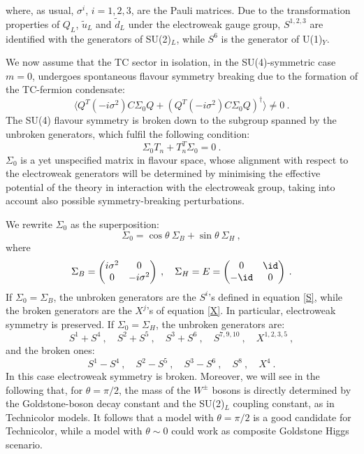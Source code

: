 %
where, as usual, $\sigma^i$,  $i = 1,2,3$, are the Pauli matrices. Due to the transformation properties of $Q_L$, $\tilde u_L$ and $\tilde d_L$ under the electroweak gauge group, $S^{1,2,3}$ are identified with the generators of SU(2)$_L$, while $S^6$ is the generator of U(1)$_Y$.

We now assume that the TC sector in isolation, in the SU(4)-symmetric case $m=0$, undergoes spontaneous flavour symmetry breaking due to the formation of the TC-fermion condensate:
\begin{equation}
\langle Q^T(-i \sigma^2) C \Sigma_0 Q + (Q^T(-i \sigma^2) C \Sigma_0 Q)^{\dagger} \rangle \neq 0 \: .
\end{equation}
%
The SU(4) flavour symmetry is broken down to the subgroup spanned by the  unbroken generators, which fulfil the following condition:
\begin{equation}
 \Sigma_0 T_n + T_n^T \Sigma_0  = 0 \: .
\end{equation}
%
$\Sigma_0$ is a yet unspecified matrix in flavour space, whose alignment with respect to the electroweak generators will be determined by minimising the effective potential of the theory in interaction with the electroweak group, taking into account also possible symmetry-breaking perturbations. 

We rewrite $\Sigma_0$ as  the superposition:
\begin{equation}
\Sigma_0 = \cos \theta \:  \Sigma_B + \sin \theta \: \Sigma_H \: ,
\end{equation}
%
where 
\begin{equation}
\Sigma_B =
\begin{pmatrix}
i \sigma^2 & 0 \\
0 & -i \sigma^2
\end{pmatrix} \:  , \quad
\Sigma_H = E =
\begin{pmatrix}
0 & \id \\
-\id &  0 
\end{pmatrix} \: . 
\end{equation}
%
If $\Sigma_0 = \Sigma_B$, the unbroken generators are the $S^i$'s defined in equation \ref{S}, while the broken generators are the $ X ^j$'s of equation \ref{X}. In particular,  electroweak symmetry is preserved.  If $\Sigma_0 = \Sigma_H$, the unbroken generators are:
\begin{equation}
S^1 + S^4 \: , \quad S^2 + S^5 \: , \quad S^3 + S^6 \: , \quad S^{7,9,10} \: , \quad X^{1, 2 ,3, 5} \: ,
\end{equation}
%
and the broken ones:
\begin{equation}
S^1 - S^4 \: , \quad S^2 - S^5 \: , \quad S^3 - S^6 \: , \quad S^8 \: , \quad  X^4  \: .
\end{equation}
%
In this case electroweak symmetry is broken. Moreover, we will see in  the following that, for $\theta = \pi/2$, the mass of the $W^{\pm}$ bosons is directly determined by the Goldstone-boson decay constant and the SU(2)$_L$ coupling constant, as in Technicolor models. It follows that a model with $\theta = \pi/2$ is a good candidate for Technicolor, while a model with $\theta \sim 0$ could work as composite Goldstone Higgs scenario.

